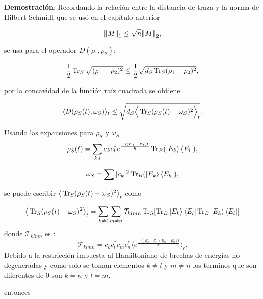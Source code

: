 \textbf{Demostración}:
Recordando la relación entre la distancia de traza y la norma de Hilbert-Schmidt que se usó en el capítulo anterior

\begin{equation}
\norm{M}_{1} \le \sqrt{n}\norm{M}_{2},
\end{equation}

se usa para el operador $D(\rho_{1}, \rho_{2})$:

\begin{equation}
\frac{1}{2} \Tr_{S} \sqrt{(\rho_{1} - \rho_{2})^{2}} \le \frac{1}{2}\sqrt{d_{S} \Tr_{S} (\rho_{1}- \rho_{2})^{2}},
\end{equation}

por la concavidad de la función raíz cuadrada se obtiene

\begin{equation}
\langle D(\rho_{S}(t),\omega_{S}) \rangle_{t} \le \sqrt{  d_{S} \Big \langle \Tr_{S}(\rho_{S}(t)-\omega_{S})^{2} \Big \rangle_{t}}.
\end{equation}

Usando las expansiones para $\rho_{S}$ y $\omega_{S}$
\begin{equation}
\rho_{S}(t)=\sum_{k,l} c_{k} c_{l}^{*} e^{\frac{-i(E_{k}-E_{l})t}{\hbar}} \Tr_{B} (\ket{E_{k}} \bra{E_{l}}),
\end{equation}

\begin{equation}
\omega_{S} = \sum |c_{k}|^{2} \Tr_{B}(\ket{E_{k}} \bra{E_{k}}),
\end{equation}

se puede escribir $ \big \langle \Tr_{S}(\rho_{S}(t)-\omega_{S})^{2} \big \rangle_{t}$ como 

\begin{equation}
\big \langle \Tr_{S}(\rho_{S}(t)-\omega_{S})^{2}  \big \rangle_{t}=\sum_{k \neq l} \sum_{m \neq n} \mathcal{T}_{klmn} \Tr_{S} [\Tr_{B} \ket{E_{k}} \bra{E_{l}} \Tr_{B} \ket{E_{k}} \bra{E_{l}}]
\end{equation}
donde $\mathcal{T}_{klmn}$ es :
\begin{equation}
\mathcal{T}_{klmn}=c_{k}c_{l}^{*}c_{m}c_{n}^{*} \Big \langle e^{\frac{-i(E_{k}-E_{l}+E_{m}-E_{n})t}{\hbar}} \Big \rangle_{t}.
\end{equation}
Debido a la restricción impuesta al Hamiltoniano de brechas de energías no degeneradas y como solo se toman elementos $k \neq l$ y $m\neq n$ los terminos que son diferentes de $0$ son $k=n$ y $l=m$,

entonces
 

